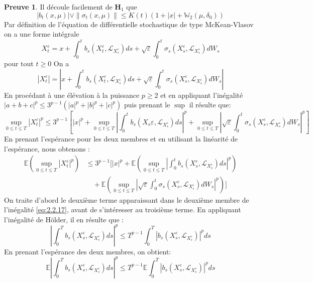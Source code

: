 \documentclass[12pt,a4paper,twoside,fleqn]{book}%
\theoremstyle{definition}
\newtheorem*{pr}{\textbf{Preuve}}
\theoremstyle{lemme}
\numberwithin{equation}{section}
\begin{document}
\begin{pr}
Il découle facilement de $\textbf{H}_1$ que 
\begin{equation}\label{eq:2.2.16}
	|b_t(x,\mu)|\vee \|\sigma_t(x,\mu)\|\leq K(t)(1+|x| + \mathbb{W}_2(\mu,\delta_0))
\end{equation}
Par définition de l'équation de différentielle stochastique de type McKean-Vlasov on a une forme intégrale
\[
X_t^\varepsilon = x +\int_{0}^{t}b_s(X_t^\varepsilon,\mathcal{L}_{X_s^\varepsilon})ds + \sqrt{\varepsilon}\int_{0}^{t}\sigma_s(X_s^\varepsilon,\mathcal{L}_{X_s^\varepsilon}) dW_s
\]
pour tout $t\geq 0$
On a
\[
|X_t^\varepsilon| = \left| x +\int_{0}^{t}b_s(X_t^\varepsilon,\mathcal{L}_{X_s^\varepsilon})ds + \sqrt{\varepsilon}\int_{0}^{t}\sigma_s(X_s^\varepsilon,\mathcal{L}_{X_s^\varepsilon}) dW_s\right|
\]
En procédant à une élévation à la puissance $p\geq 2$ et en appliquant l'inégalité $|a+b+c|^p\leq 3^{p-1}(|a|^p + |b|^p + |c|^p)$ puis prenant le $\sup $ il résulte que:
\[
\sup_{0\leq t \leq T}|X_t^\varepsilon|^p \leq 3^{p-1}\left[ |x|^p + \sup_{0\leq t \leq T}\left|\int_{0}^{t}b_s(X_s\varepsilon,\mathcal{L}_{X_s^\varepsilon})ds\right|^p +\sup_{0\leq t \leq T}\left|\sqrt{\varepsilon}\int_{0}^{t}\sigma_s(X_s^\varepsilon,\mathcal{L}_{X_s^\varepsilon})dW_s\right|^p\right]
\]
En prenant l’espérance pour les deux membres et en utilisant la linéarité de l’espérance, nous obtenons :
\begin{equation}\label{eq:2.2.17}
\begin{aligned}
\mathbb{E}\left(\sup_{0\leq t \leq T}|X_t^\varepsilon|^p\right) &\leq 3^{p-1}\Bigg[ |x|^p + \mathbb{E}\left(\sup_{0\leq t \leq T}\left|\int_{0}^{t}b_s(X_s^\varepsilon,\mathcal{L}_{X_s^\varepsilon})ds\right|^p\right)\\
&\quad+\mathbb{E}\left(\sup_{0\leq t \leq T}\left|\sqrt{\varepsilon}\int_{0}^{t}\sigma_s(X_s^\varepsilon,\mathcal{L}_{X_s^\varepsilon})dW_s\right|^p\right) \Bigg]
\end{aligned}
\end{equation}
On traite d’abord le deuxième terme apparaissant dans le deuxième membre de l’inégalité \ref{eq:2.2.17}, avant de s’intéresser au troisième terme.
En appliquant l’inégalité de Hölder, il en résulte que :
\[
\left|\int_{0}^{T}b_s(X_s^\varepsilon,\mathcal{L}_{X_s^\varepsilon})ds\right|^p \leq T^{p-1}\int_{0}^{T}\left|b_s(X_s^\varepsilon,\mathcal{L}_{X_s^\varepsilon})\right|^pds\]
En prenant l’espérance des deux membres, on obtient:
\[
\mathbb{E}\left|\int_{0}^{T}b_s(X_s^\varepsilon,\mathcal{L}_{X_s^\varepsilon})ds\right|^p \leq T^{p-1}\mathbb{E}\int_{0}^{T}\left|b_s(X_s^\varepsilon,\mathcal{L}_{X_s^\varepsilon})\right|^pds
\]
\end{pr}
\end{document}
